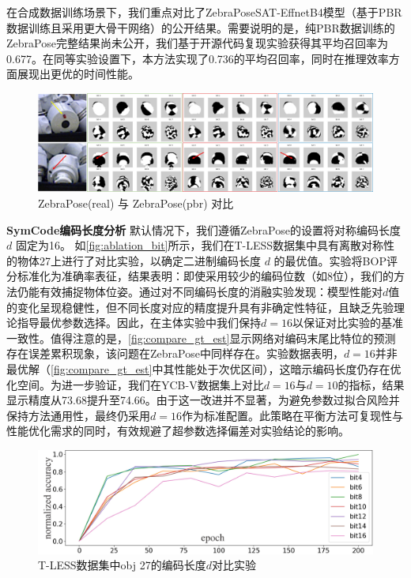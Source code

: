 \par 在合成数据训练场景下，我们重点对比了ZebraPoseSAT-EffnetB4模型（基于PBR数据训练且采用更大骨干网络）的公开结果。需要说明的是，纯PBR数据训练的ZebraPose完整结果尚未公开，我们基于开源代码复现实验获得其平均召回率为0.677。在同等实验设置下，本方法实现了0.736的平均召回率，同时在推理效率方面展现出更优的时间性能。

\begin{figure}[ht]
        \centerline{\includegraphics[width=1.0\textwidth]{figure/symnet/vis_zebrapose_gt_real_pbr_support.jpg}}
        \caption{ZebraPose(real) 与 ZebraPose(pbr) 对比}
        \label{fig:vis_zebrapose_gt_real_pbr_support}
\end{figure}

\textbf{SymCode编码长度分析 } 默认情况下，我们遵循ZebraPose\cite{su2022zebrapose}的设置将对称编码长度 $d$ 固定为16。 如\autoref{fig:ablation_bit}所示，我们在T-LESS数据集中具有离散对称性的物体27上进行了对比实验，以确定二进制编码长度 $d$ 的最优值。实验将BOP评分标准化为准确率表征，结果表明：即使采用较少的编码位数（如8位），我们的方法仍能有效捕捉物体位姿。通过对不同编码长度的消融实验发现：模型性能对$d$值的变化呈现稳健性，但不同长度对应的精度提升具有非确定性特征，且缺乏先验理论指导最优参数选择。因此，在主体实验中我们保持$d=16$以保证对比实验的基准一致性。值得注意的是，\autoref{fig:compare_gt_est}显示网络对编码末尾比特位的预测存在误差累积现象，该问题在ZebraPose中同样存在。实验数据表明，$d=16$并非最优解（\autoref{fig:compare_gt_est}中其性能处于次优区间），这暗示编码长度仍存在优化空间。为进一步验证，我们在YCB-V数据集上对比$d=16$与$d=10$的指标，结果显示精度从73.68提升至74.66。由于这一改进并不显著，为避免参数过拟合风险并保持方法通用性，最终仍采用$d=16$作为标准配置。此策略在平衡方法可复现性与性能优化需求的同时，有效规避了超参数选择偏差对实验结论的影响。

\begin{figure}[ht]
        \centerline{\includegraphics[width=1.0\textwidth]{figure/symnet/ablation_bit.jpg}}
        \caption{T-LESS数据集中obj 27的编码长度$d$对比实验}
        \label{fig:ablation_bit}
\end{figure}

